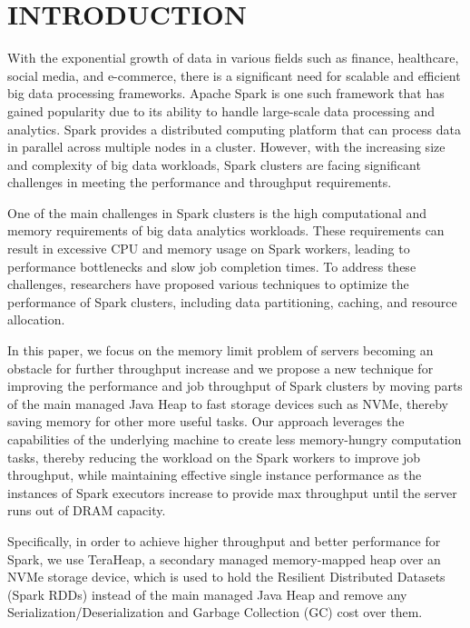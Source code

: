 \documentclass[twocolumn,10pt]{asme2e}
\begin{document}
\section*{INTRODUCTION}

With the exponential growth of data in various fields such as finance, healthcare, social media, and e-commerce, there is a significant need for scalable and efficient big data processing frameworks. Apache Spark is one such framework that has gained popularity due to its ability to handle large-scale data processing and analytics. Spark provides a distributed computing platform that can process data in parallel across multiple nodes in a cluster. However, with the increasing size and complexity of big data workloads, Spark clusters are facing significant challenges in meeting the performance and throughput requirements.

One of the main challenges in Spark clusters is the high computational and memory requirements of big data analytics workloads. These requirements can result in excessive CPU and memory usage on Spark workers, leading to performance bottlenecks and slow job completion times. To address these challenges, researchers have proposed various techniques to optimize the performance of Spark clusters, including data partitioning, caching, and resource allocation.

In this paper, we focus on the memory limit problem of servers becoming an obstacle for further throughput increase and we propose a new technique for improving the performance and job throughput of Spark clusters by moving parts of the main managed Java Heap to fast storage devices such as NVMe, thereby saving memory for other more useful tasks. Our approach leverages the capabilities of the underlying machine to create less memory-hungry computation tasks, thereby reducing the workload on the Spark workers to improve job throughput, while maintaining effective single instance performance as the instances of Spark executors increase to provide max throughput until the server runs out of DRAM capacity.

Specifically, in order to achieve higher throughput and better performance for Spark, we use TeraHeap, a secondary managed memory-mapped heap over an NVMe storage device, which is used to hold the Resilient Distributed Datasets (Spark RDDs) instead of the main managed Java Heap and remove any Serialization/Deserialization and Garbage Collection (GC) cost over them.
\end{document}
